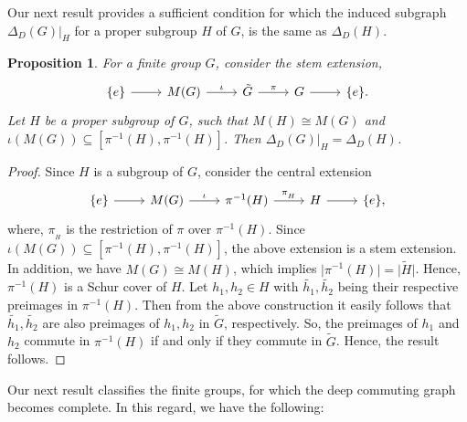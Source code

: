 \documentclass[12pt,a4paper]{article}
\newtheorem{proposition}[theorem]{Proposition}
\begin{document}
Our next result provides a sufficient condition for which the induced subgraph $\Delta_D(G)\vert_H$ for a proper subgroup $H$ of $G$, is the same as $\Delta_D(H)$. 
\begin{proposition}\label{induced_subgraph_equality}
For a finite group $G$, consider the stem extension,
\[
\begin{tikzcd}
  \{e\} \arrow[r] & M(G) \arrow[r, "\iota"] & \tilde{G} \arrow[r, "\pi"] & G \arrow[r] & \{e\}. 
\end{tikzcd}
\]
Let $H$ be a proper subgroup of $G$, such that $M(H)\cong M(G)$ and $\iota(M(G))\subseteq [\pi^{-1}(H),\pi^{-1}(H)]$. Then $\Delta_D(G)\vert_H=\Delta_D(H)$.
\end{proposition}

\begin{proof}
Since $H$ is a subgroup of $G$, consider the central extension
\[
\begin{tikzcd}
  \{e\} \arrow[r] & M(G) \arrow[r, "\iota"] & \pi^{-1}(H) \arrow[r, "\pi_{_H}"] & H \arrow[r] & \{e\}, 
\end{tikzcd}
\]
where, $\pi_{_H}$ is the restriction of $\pi$ over $\pi^{-1}(H)$. Since $\iota(M(G))\subseteq [\pi^{-1}(H),\pi^{-1}(H)]$, the above extension is a stem extension. In addition, we have $M(G)\cong M(H)$, which implies $\lvert\pi^{-1}(H)\rvert=\lvert\tilde{H}\rvert$. Hence, $\pi^{-1}(H)$ is a Schur cover of $H$. Let $h_1,h_2\in H$ with $\tilde{h_1},\tilde{h_2}$ being their respective preimages in $\pi^{-1}(H)$. Then from the above construction it easily follows that $\tilde{h_1},\tilde{h_2}$ are also preimages of $h_1, h_2$ in $\tilde{G}$, respectively. So, the preimages of $h_1$ and $h_2$ commute in $\pi^{-1}(H)$ if and only if they commute in $\tilde{G}$. Hence, the result follows.  
\end{proof}

Our next result classifies the finite groups, for which the deep commuting graph becomes complete. In this regard, we have the following:
\end{document}
